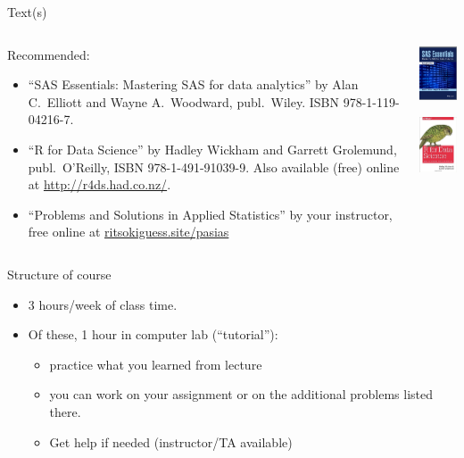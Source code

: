 \documentclass[
  ignorenonframetext,
]{beamer}
\providecommand{\tightlist}{%
  \setlength{\itemsep}{0pt}\setlength{\parskip}{0pt}}
\begin{document}
\begin{frame}{Text(s)}
\protect\hypertarget{texts}{}

\begin{columns}
    \begin{column}{0.7\textwidth}
Recommended:
  \begin{itemize}
\item ``SAS Essentials: Mastering SAS for data analytics'' by Alan C.\
  Elliott and Wayne A.\ Woodward, publ.\ Wiley. ISBN 978-1-119-04216-7.
\item ``R for Data Science'' by Hadley Wickham and Garrett Grolemund,
  publ.\ O'Reilly, ISBN 978-1-491-91039-9. Also available (free)
  online at \url{http://r4ds.had.co.nz/}.
  \item ``Problems and Solutions in Applied Statistics'' by your instructor, free online at \url{ritsokiguess.site/pasias}
\end{itemize}
    \end{column}
    \begin{column}{0.3\textwidth}
      \includegraphics[width=1in]{Screenshot_2018-08-17_12-24-26.png}

      \includegraphics[width=1in]{r4ds}
    \end{column}
  \end{columns}

\end{frame}

\begin{frame}{Structure of course}
\protect\hypertarget{structure-of-course}{}

\begin{itemize}
\tightlist
\item
  3 hours/week of class time.
\item
  Of these, 1 hour in computer lab (``tutorial''):

  \begin{itemize}
  \tightlist
  \item
    practice what you learned from lecture
  \item
    you can work on your assignment or on the additional problems listed
    there.
  \item
    Get help if needed (instructor/TA available)
  \end{itemize}
\end{itemize}

\end{frame}
\end{document}
